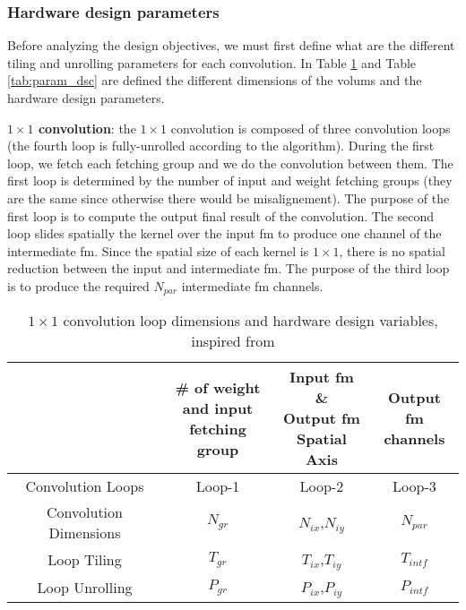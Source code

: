 \subsubsection{Hardware design parameters}
%
Before analyzing the design objectives, we must first define what are the different tiling and unrolling parameters for each convolution. In Table \ref{tab:param_c11} and Table \ref{tab:param_dsc} are defined the different dimensions of the volums and the hardware design parameters.

\textbf{$1 \times 1$ convolution}: the $1 \times 1$ convolution is composed of three convolution loops (the fourth loop is fully-unrolled according to the algorithm). During the first loop, we fetch each fetching group and we do the convolution between them. The first loop is determined by the number of input and weight fetching groups (they are the same since otherwise there would be misalignement). The purpose of the first loop is to compute the output final result of the convolution. The second loop slides spatially the kernel over the input \acrshort{fm} to produce one channel of the intermediate \acrshort{fm}. Since the spatial size of each kernel is $1 \times 1$, there is no spatial reduction between the input and intermediate \acrshort{fm}. The purpose of the third loop is to produce the required $N_{par}$ intermediate \acrshort{fm} channels.
%
\begin{table}[H]
    \centering
    \begin{tabular}{c|c|c|c}
    \hline \hline
    & \makecell{\# of weight \\ and input \\ fetching group} & \makecell{Input \acrshort{fm} \& \\ Output \acrshort{fm} \\ Spatial Axis} & \makecell{Output \acrshort{fm} \\ channels} \\
    \hline
    Convolution Loops & Loop-1 & Loop-2 & Loop-3 \\
    Convolution Dimensions & $N_{gr}$ & $N_{ix}$,$N_{iy}$ & $N_{par}$ \\
    Loop Tiling            & $T_{gr}$ & $T_{ix}$,$T_{iy}$ & $T_{intf}$ \\
    Loop Unrolling         & $P_{gr}$ & $P_{ix}$,$P_{iy}$ & $P_{intf}$ \\
    \hline \hline
    \end{tabular}
    \caption{$1 \times 1$ convolution loop dimensions and hardware design variables, inspired from \cite{ma_optimizing_2018}}
    \label{tab:param_c11}
\end{table}
